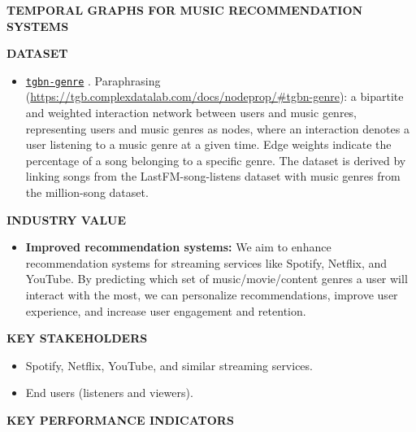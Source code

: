 \documentclass[10pt, letterpaper]{article}
\renewcommand{\title}[1]{%
	\begin{center}
		{\Large \bfseries \uppercase{#1}}
	\end{center}
}
\renewcommand{\section}[1]{%
	    \vspace{\parskip}
		{\large \bfseries\uppercase{#1}}
}
\newcommand{\itemTitle}[1]{%
	{\bfseries{#1}}
}
\begin{document}
	
\title{Temporal Graphs for Music Recommendation Systems}
	
\section{Dataset}
	
\begin{itemize}
\item 
\href{https://github.com/shenyangHuang/TGB/blob/main/tgb/datasets/dataset_scripts/tgbn-genre.py}{\tt{tgbn-genre}} \cite{tgbn-genre}. Paraphrasing \cite{H_web:2023} (\url{https://tgb.complexdatalab.com/docs/nodeprop/#tgbn-genre}): a bipartite and weighted interaction network between users and music genres, representing users and music genres as nodes, where an interaction denotes a user listening to a music genre at a given time. Edge weights indicate the percentage of a song belonging to a specific genre. The dataset is derived by linking songs from the LastFM-song-listens dataset with music genres from the million-song dataset. 

\end{itemize}
	
\section{Industry value}

\begin{itemize}
\item \itemTitle{Improved recommendation systems:} We aim to enhance recommendation systems for streaming services like Spotify, Netflix, and YouTube. By predicting which set of music/movie/content genres a user will interact with the most, we can personalize recommendations, improve user experience, and increase user engagement and retention.
\end{itemize}
	
\section{Key Stakeholders}
\begin{itemize}
\item Spotify, Netflix, YouTube, and similar streaming services.
\item End users (listeners and viewers).
\end{itemize}
	
\section{Key Performance Indicators}
\end{document}

